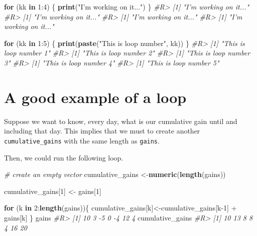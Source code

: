 \documentclass[]{book}
\newenvironment{Shaded}{}{}
\newcommand{\CommentTok}[1]{\textcolor[rgb]{0.38,0.63,0.69}{\textit{#1}}}
\newcommand{\ControlFlowTok}[1]{\textcolor[rgb]{0.00,0.44,0.13}{\textbf{#1}}}
\newcommand{\DecValTok}[1]{\textcolor[rgb]{0.25,0.63,0.44}{#1}}
\newcommand{\KeywordTok}[1]{\textcolor[rgb]{0.00,0.44,0.13}{\textbf{#1}}}
\newcommand{\NormalTok}[1]{#1}
\newcommand{\OperatorTok}[1]{\textcolor[rgb]{0.40,0.40,0.40}{#1}}
\newcommand{\StringTok}[1]{\textcolor[rgb]{0.25,0.44,0.63}{#1}}
\theoremstyle{definition}
\theoremstyle{definition}
\theoremstyle{definition}
\theoremstyle{remark}
\begin{document}
\begin{Shaded}
\begin{Highlighting}[]
\ControlFlowTok{for}\NormalTok{ (kk }\ControlFlowTok{in} \DecValTok{1}\OperatorTok{:}\DecValTok{4}\NormalTok{) \{}
  \KeywordTok{print}\NormalTok{(}\StringTok{"I'm working on it..."}\NormalTok{)}
\NormalTok{\}}
\CommentTok{#R> [1] "I'm working on it..."}
\CommentTok{#R> [1] "I'm working on it..."}
\CommentTok{#R> [1] "I'm working on it..."}
\CommentTok{#R> [1] "I'm working on it..."}

\ControlFlowTok{for}\NormalTok{ (kk }\ControlFlowTok{in} \DecValTok{1}\OperatorTok{:}\DecValTok{5}\NormalTok{) \{}
  \KeywordTok{print}\NormalTok{(}\KeywordTok{paste}\NormalTok{(}\StringTok{"This is loop number"}\NormalTok{, kk))}
\NormalTok{\}}
\CommentTok{#R> [1] "This is loop number 1"}
\CommentTok{#R> [1] "This is loop number 2"}
\CommentTok{#R> [1] "This is loop number 3"}
\CommentTok{#R> [1] "This is loop number 4"}
\CommentTok{#R> [1] "This is loop number 5"}
\end{Highlighting}
\end{Shaded}

\hypertarget{a-good-example-of-a-loop}{%
\section{A good example of a loop}\label{a-good-example-of-a-loop}}

Suppose we want to know, every day, what is our cumulative gain until
and including that day. This implies that we must to create another
\texttt{cumulative\_gains} with the same length as \texttt{gains}.

Then, we could run the following loop.

\begin{Shaded}
\begin{Highlighting}[]
\CommentTok{# create an empty vector}
\NormalTok{cumulative_gains <-}\KeywordTok{numeric}\NormalTok{(}\KeywordTok{length}\NormalTok{(gains)) }

\NormalTok{cumulative_gains[}\DecValTok{1}\NormalTok{] <-}\StringTok{ }\NormalTok{gains[}\DecValTok{1}\NormalTok{]  }
 
\ControlFlowTok{for}\NormalTok{ (k }\ControlFlowTok{in} \DecValTok{2}\OperatorTok{:}\KeywordTok{length}\NormalTok{(gains))\{}
\NormalTok{  cumulative_gains[k]<-cumulative_gains[k}\DecValTok{-1}\NormalTok{] }\OperatorTok{+}\StringTok{ }\NormalTok{gains[k]}
\NormalTok{\}}
\NormalTok{gains}
\CommentTok{#R> [1] 10  3 -5  0 -4 12  4}
\NormalTok{cumulative_gains}
\CommentTok{#R> [1] 10 13  8  8  4 16 20}
\end{Highlighting}
\end{Shaded}
\end{document}
